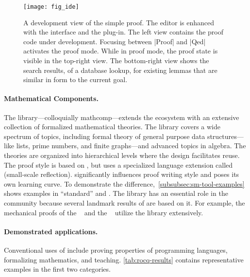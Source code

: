 \begin{figure}[ht]
\begin{center}
\texttt{[image: fig\_ide]}
\end{center}
\caption[Development view of the simple Rocq proof]{
A development view of the simple  proof. The  editor is
enhanced with the \href{https://proofgeneral.github.io/}{}
interface and the
\href{https://github.com/cpitclaudel/company-coq}{} plug-in.
The left view contains the proof code under development. Focusing between
\pr|Proof| and \pr|Qed| activates the {proof mode}. While in proof mode, the
proof state is visible in the top-right view. The bottom-right view shows the
search results, of a database lookup, for existing lemmas that are similar
in form to the current goal.}
\label{fig:rocq-use}
\end{figure}

\paragraph*{Mathematical Components.}
The  library---colloquially mathcomp---extends the
 ecosystem with an extensive collection of formalized mathematical
theories. The library covers a wide spectrum of topics, including formal theory
of general purpose data structures---like lists, prime numbers, and finite
graphs---and advanced topics in algebra. The theories are organized into
hierarchical levels where the design facilitates reuse. The proof style is based
on , but  uses a specialized language
extension called  (small-scale reflection). 
significantly influences proof writing style and poses its own learning curve.
To demonstrate the difference,~\autoref{subsubsec:sm-tool-examples} shows
examples in \enquote{standard}  and . The
 library has an essential role in the 
community because several landmark results of  are
based on it. For example, the mechanical proofs of the ~\cite{gonthier2008} and the ~\cite{gonthier2013}
utilize the library extensively.

\paragraph*{Demonstrated applications.}
Conventional uses of  include proving properties of programming
languages, formalizing mathematics, and teaching. \autoref{tab:rocq-results}
contains representative examples in the first two categories.

